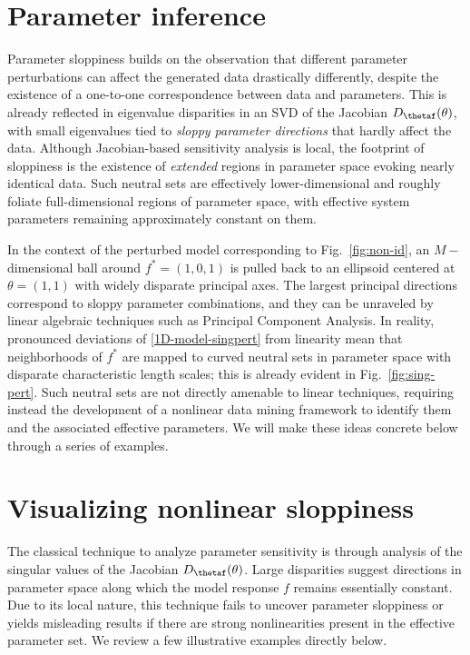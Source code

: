\section{Parameter inference}

Parameter sloppiness builds on the observation that different
parameter perturbations can affect the generated data drastically
differently, despite the existence of a one-to-one correspondence
between data and parameters.  This is already reflected in eigenvalue
disparities in an SVD of the Jacobian
$D_\thetaf(\theta)$, with small eigenvalues tied to
\emph{sloppy parameter directions} that hardly affect the data.
Although Jacobian-based sensitivity analysis is local, the footprint
of sloppiness is the existence of \emph{extended} regions in parameter
space evoking nearly identical data.  Such neutral sets are
effectively lower-dimensional and roughly foliate full-dimensional
regions of parameter space, with effective system parameters remaining
approximately constant on them.


In the context of the perturbed model corresponding to
Fig.~\ref{fig:non-id}, an $M-$dimensional ball around
$f^*=(1,0,1)$ is pulled back to an ellipsoid centered at
$\theta = (1,1)$ with widely disparate principal axes.  The
largest principal directions correspond to sloppy parameter
combinations, and they can be unraveled by linear algebraic techniques
such as Principal Component Analysis.  In reality, pronounced
deviations of \eqref{1D-model-singpert} from linearity mean that
neighborhoods of $f^*$ are mapped to curved neutral sets in
parameter space with disparate characteristic length scales; this is
already evident in Fig.~\ref{fig:sing-pert}.  Such neutral sets are
not directly amenable to linear techniques, requiring instead the
development of a nonlinear data mining framework to identify them and
the associated effective parameters.  We will make these ideas
concrete below through a series of examples.

\section{Visualizing nonlinear sloppiness}
The classical technique to analyze parameter sensitivity is through
analysis of the singular values of the Jacobian
$D_\thetaf(\theta)$.  Large disparities suggest
directions in parameter space along which the model response
$f$ remains essentially constant.  Due to its local nature,
this technique fails to uncover parameter sloppiness or yields
misleading results if there are strong nonlinearities present in the
effective parameter set. We review a few illustrative examples
directly below.

